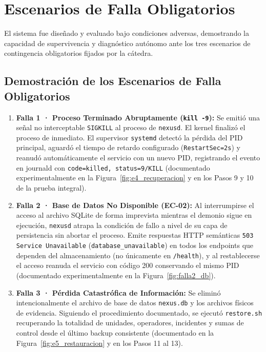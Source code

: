 \documentclass[10pt,a4paper]{article}
\begin{document}
\section{Escenarios de Falla Obligatorios}

El sistema fue diseñado y evaluado bajo condiciones adversas, demostrando la capacidad de supervivencia y diagnóstico autónomo ante los tres escenarios de contingencia obligatorios fijados por la cátedra.

\subsection{Demostración de los Escenarios de Falla Obligatorios}

\begin{enumerate}[leftmargin=*]
    \item \textbf{Falla 1 · Proceso Terminado Abruptamente (\texttt{kill -9}):}
    Se emitió una señal no interceptable \texttt{SIGKILL} al proceso de \texttt{nexusd}. El kernel finalizó el proceso de inmediato. El supervisor \texttt{systemd} detectó la pérdida del PID principal, aguardó el tiempo de retardo configurado (\texttt{RestartSec=2s}) y reanudó automáticamente el servicio con un nuevo PID, registrando el evento en journald con \texttt{code=killed, status=9/KILL} (documentado experimentalmente en la Figura~\ref{fig:e4_recuperacion} y en los Pasos 9 y 10 de la prueba integral).
    \item \textbf{Falla 2 · Base de Datos No Disponible (EC-02):}
    Al interrumpirse el acceso al archivo SQLite de forma imprevista mientras el demonio sigue en ejecución, \texttt{nexusd} atrapa la condición de fallo a nivel de su capa de persistencia sin abortar el proceso. Emite respuestas HTTP semánticas \texttt{503 Service Unavailable} (\texttt{database\_unavailable}) en todos los endpoints que dependen del almacenamiento (no únicamente en \texttt{/health}), y al restablecerse el acceso reanuda el servicio con código 200 conservando el mismo PID (documentado experimentalmente en la Figura~\ref{fig:falla2_db}).
    \item \textbf{Falla 3 · Pérdida Catastrófica de Información:}
    Se eliminó intencionalmente el archivo de base de datos \texttt{nexus.db} y los archivos físicos de evidencia. Siguiendo el procedimiento documentado, se ejecutó \texttt{restore.sh} recuperando la totalidad de unidades, operadores, incidentes y sumas de control desde el último backup consistente (documentado en la Figura~\ref{fig:e5_restauracion} y en los Pasos 11 al 13).
\end{enumerate}
\end{document}
